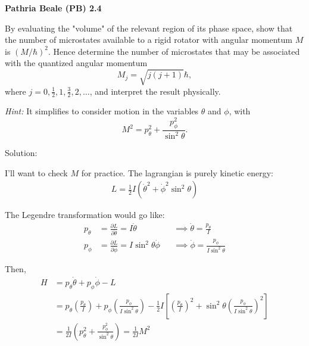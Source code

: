 \begin{homeworkProblem}
    \textbf{Pathria Beale (PB) 2.4}

    By evaluating the "volume" of the relevant region of its phase space, show that
    the number of microstates available to a rigid rotator with angular momentum
    $M$ is $(M/\hbar)^2$. Hence determine the number of microstates that may be
    associated with the quantized angular momentum
    \[
        M_j=\sqrt{j(j+1)}\hbar,
    \]
    where $j=0,\frac{1}{2},1,\frac{3}{2},2,\ldots$, and interpret the result physically.

    \textit{Hint:} It simplifies to consider motion in the variables $\theta$ and $\phi$,
    with
    \[
        M^2=p_\theta^2+\frac{p_\phi^2}{\sin^2\theta}.
    \]
    \begin{callout}{Solution:}


       I'll want to check $M$ for practice. The lagrangian is purely kinetic energy:
        \begin{align*}
            L=\frac{1}{2}I (\dot{\theta}^{2} + \dot{\phi}^{2}\sin^{2}\theta)
        \end{align*}

        The Legendre transformation would go like:
        \begin{align*}
            p_\theta &= \frac{\partial L}{\partial \dot{\theta}} = I\dot{\theta} &&\implies \dot{\theta} = \frac{p_\theta}{I} \\ 
            p_\phi &= \frac{\partial L}{\partial \dot{\phi}} = I \sin^{2}\theta \dot{\phi} &&\implies \dot{\phi} = \frac{p_\phi}{I \sin^{2}\theta}
        \end{align*}

        Then,
        \begin{align*}
            H &= p_\theta \dot{\theta} + p_\phi \dot{\phi} - L \\
            &= p_\theta\left(\frac{p_\theta}{I}\right)+p_\phi\left(\frac{p_\phi}{I \sin ^2 \theta}\right)-\frac{1}{2} I\left[\left(\frac{p_\theta}{I}\right)^2+\sin ^2 \theta\left(\frac{p_\phi}{I \sin ^2 \theta}\right)^2\right] \\
&=\frac{1}{2 I}\left(p_\theta^2+\frac{p_\phi^2}{\sin ^2 \theta}\right) = \frac{1}{2I} M^{2}
        \end{align*}


\end{callout}
\end{homeworkProblem}
